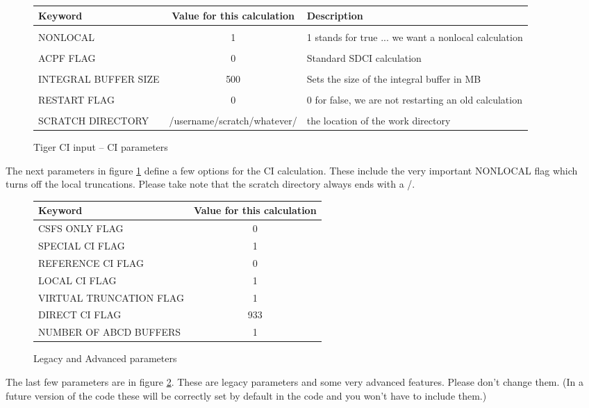 \documentclass{article}
\begin{document}
\begin{figure}[h!] 
	\begin{tabular}{ p{4cm} | c| p{5cm} }
		\hline
		\textbf{Keyword} & \textbf{Value for this calculation} & \textbf{Description} \\ \hline
		& &\\
		NONLOCAL& 1& 1 stands for true ... we want a nonlocal calculation \\
		& &\\
		ACPF FLAG&0 &Standard SDCI calculation \\
		& &\\
		INTEGRAL BUFFER SIZE& 500 &Sets the size of the integral buffer in MB \\ 
		& &\\
		RESTART FLAG& 0 & 0 for false, we are not restarting an old calculation \\  
		& &\\
		SCRATCH DIRECTORY& /username/scratch/whatever/ & the location of the work directory \\ \hline
	\end{tabular}
	\centering
	\caption{Tiger CI input -- CI parameters}
	\label{tableCiOptions}
\end{figure}

The next parameters in figure \ref{tableCiOptions} define a few options for the CI calculation. These include the very important NONLOCAL flag which turns off the local truncations. Please take note that the scratch directory always ends with a /.


\begin{figure}[h!] 
	\begin{tabular}{ l | c  }
		\hline
		\textbf{Keyword} & \textbf{Value for this calculation} \\ \hline
		CSFS ONLY FLAG& 0  \\ 
		SPECIAL CI FLAG& 1  \\ 
		REFERENCE CI FLAG&0  \\
		LOCAL CI FLAG& 1   \\ 
		VIRTUAL TRUNCATION FLAG& 1 \\ 
		DIRECT CI FLAG& 933 \\ 
		NUMBER OF ABCD BUFFERS& 1 \\  \hline
	\end{tabular}
	\centering
	\caption{Legacy and Advanced parameters}
	\label{tableLegacy}
\end{figure}

The last few parameters are in figure \ref{tableLegacy}. These are legacy parameters and some very advanced features. Please don't change them. (In a future version of the code these will be correctly set by default in the code and you won't have to include them.)
\end{document}
